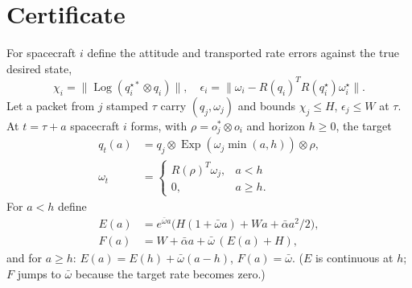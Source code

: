 \documentclass[journal]{IEEEtran}
\DeclareMathOperator{\Log}{Log}
\DeclareMathOperator{\Exp}{Exp}
\begin{document}


\section{Certificate}\label{sec:cert}
For spacecraft $i$ define the attitude and transported rate errors against the true desired state,
\begin{equation}
\chi_i=\|\Log(q_i^{\star*}\!\otimes q_i)\|,\quad
\epsilon_i=\|\omega_i-R(q_i)^TR(q_i^\star)\omega_i^\star\|.
\end{equation}
Let a packet from $j$ stamped $\tau$ carry $(q_j,\omega_j)$ and bounds $\chi_j\le H$, $\epsilon_j\le W$ at $\tau$. At $t=\tau+a$ spacecraft $i$ forms, with $\rho=o_j^*\otimes o_i$ and horizon $h\ge0$, the target
\begin{equation}
\begin{aligned}q_{t}(a)&=q_j\otimes\Exp(\omega_j\min(a,h))\otimes\rho,\\ \omega_{t}&=\begin{cases}R(\rho)^T\omega_j,&a<h\\ 0,&a\ge h.\end{cases}\end{aligned}
\end{equation}
For $a<h$ define
\begin{align}
E(a)&=e^{\bar\omega a}\big(H(1+\bar\omega a)+Wa+\bar\alpha a^2/2\big),\\
F(a)&=W+\bar\alpha a+\bar\omega\,(E(a)+H),
\end{align}
and for $a\ge h$: $E(a)=E(h)+\bar\omega(a-h)$, $F(a)=\bar\omega$. ($E$ is continuous at $h$; $F$ jumps to $\bar\omega$ because the target rate becomes zero.)
\end{document}
